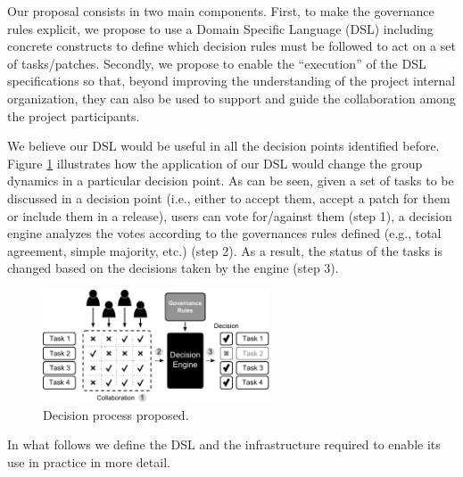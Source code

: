 Our proposal consists in two main components. First, to make the governance rules explicit, we propose to use a Domain Specific Language (DSL) including concrete constructs to define which decision rules must be followed to act on a set of tasks/patches. Secondly, we propose to enable the ``execution'' of the DSL specifications so that, beyond improving the understanding of the project internal organization, they can also be used to support and guide the collaboration among the project participants.

We believe our DSL would be useful in all the decision points identified before. Figure \ref{fig:process} illustrates how the application of our DSL would change the group dynamics in a particular decision point. As can be seen, given a set of tasks to be discussed in a decision point (i.e., either to accept them, accept a patch for them or include them in a release), users can vote for/against them (step 1), a decision engine analyzes the votes according to the governances rules defined (e.g., total agreement, simple majority, etc.) (step 2). As a result, the status of the tasks is changed based on the decisions taken by the engine (step 3). 

\begin{figure}[t]  
  \centering
  \includegraphics[width=0.6\textwidth]{./figures/processB}
  \caption{Decision process proposed.}
  \label{fig:process}
\end{figure}

In what follows we define the DSL and the infrastructure required to enable its use in practice in more detail.


